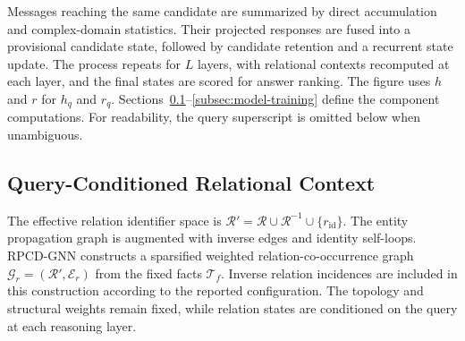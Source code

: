 \documentclass[a4paper,fleqn]{cas-dc}
\begin{document}
Messages reaching the same candidate are summarized by direct accumulation and complex-domain statistics. Their projected responses are fused into a provisional candidate state, followed by candidate retention and a recurrent state update. The process repeats for $L$ layers, with relational contexts recomputed at each layer, and the final states are scored for answer ranking. The figure uses $h$ and $r$ for $h_q$ and $r_q$. Sections~\ref{subsec:relation-codiffusion}--\ref{subsec:model-training} define the component computations. For readability, the query superscript is omitted below when unambiguous.

\subsection{Query-Conditioned Relational Context}\label{subsec:relation-codiffusion}

The effective relation identifier space is $\mathcal{R}'=\mathcal{R}\cup\mathcal{R}^{-1}\cup\{r_{\mathrm{id}}\}$. The entity propagation graph is augmented with inverse edges and identity self-loops. RPCD-GNN constructs a sparsified weighted relation-co-occurrence graph $\mathcal{G}_{r}=(\mathcal{R}',\mathcal{E}_{r})$ from the fixed facts $\mathcal{T}_{f}$. Inverse relation incidences are included in this construction according to the reported configuration. The topology and structural weights remain fixed, while relation states are conditioned on the query at each reasoning layer.
\end{document}
